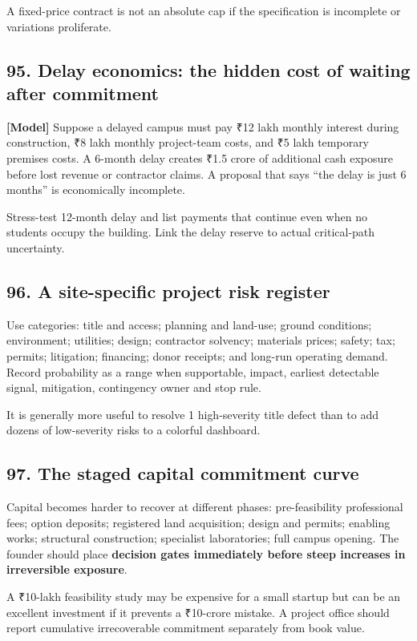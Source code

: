 A fixed-price contract is not an absolute cap if the specification is incomplete or variations proliferate.


\subsection{95. Delay economics: the hidden cost of waiting after commitment}

\textbf{[Model]} Suppose a delayed campus must pay \textnormal{₹}12 lakh monthly interest during construction, \textnormal{₹}8 lakh monthly project-team costs, and \textnormal{₹}5 lakh temporary premises costs. A 6-month delay creates \textnormal{₹}1.5 crore of additional cash exposure before lost revenue or contractor claims. A proposal that says ``the delay is just 6 months'' is economically incomplete.

Stress-test 12-month delay and list payments that continue even when no students occupy the building. Link the delay reserve to actual critical-path uncertainty.


\subsection{96. A site-specific project risk register}

Use categories: title and access; planning and land-use; ground conditions; environment; utilities; design; contractor solvency; materials prices; safety; tax; permits; litigation; financing; donor receipts; and long-run operating demand. Record probability as a range when supportable, impact, earliest detectable signal, mitigation, contingency owner and stop rule.

It is generally more useful to resolve 1 high-severity title defect than to add dozens of low-severity risks to a colorful dashboard.


\subsection{97. The staged capital commitment curve}

Capital becomes harder to recover at different phases: pre-feasibility professional fees; option deposits; registered land acquisition; design and permits; enabling works; structural construction; specialist laboratories; full campus opening. The founder should place \textbf{decision gates immediately before steep increases in irreversible exposure}.

A \textnormal{₹}10-lakh feasibility study may be expensive for a small startup but can be an excellent investment if it prevents a \textnormal{₹}10-crore mistake. A project office should report cumulative irrecoverable commitment separately from book value.


